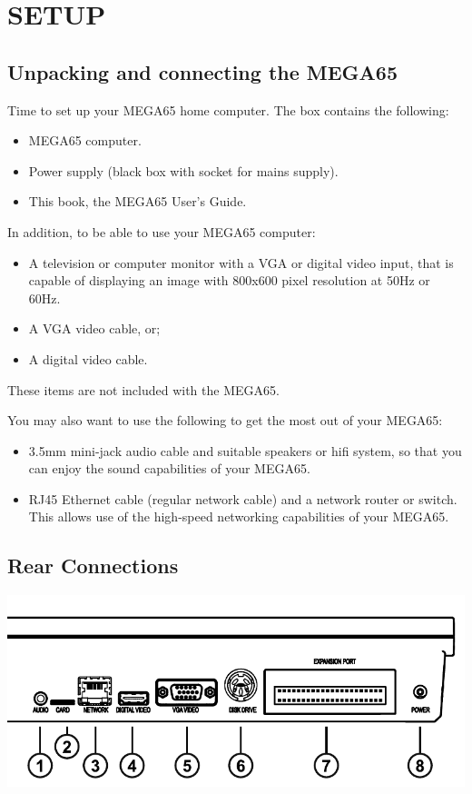\chapter{SETUP}
\section{Unpacking and connecting the MEGA65}

Time to set up your MEGA65 home computer.
The box contains the following:
\begin{itemize}
\setlength\itemsep{-0.75mm}
\item MEGA65 computer.
\item Power supply (black box with socket for mains supply).
\item This book, the MEGA65 User's Guide.
\end{itemize}

In addition, to be able to use your MEGA65 computer:
\begin{itemize}
\item A television or computer monitor with a VGA or digital video input, that is capable of displaying an image with 800x600 pixel resolution at 50Hz or 60Hz.
\item A VGA video cable, or;
\item A digital video cable.
\end{itemize}

These items are not included with the MEGA65.

You may also want to use the following to get the most out of your MEGA65:
\begin{itemize}
\item 3.5mm mini-jack audio cable and suitable speakers or hifi system, so that you can enjoy the sound capabilities of your MEGA65.
\item RJ45 Ethernet cable (regular network cable) and a network router or switch. This allows use of the high-speed networking capabilities of your MEGA65.
\end{itemize}

\section{Rear Connections}

\includegraphics[width=\linewidth]{images/illustrations/mega65-rear.pdf}


